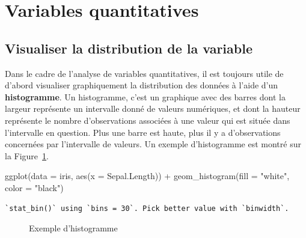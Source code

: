 \documentclass[
  letterpaper,
]{book}
\newenvironment{Shaded}{\begin{snugshade}}{\end{snugshade}}
\newcommand{\AttributeTok}[1]{\textcolor[rgb]{0.40,0.45,0.13}{#1}}
\newcommand{\FunctionTok}[1]{\textcolor[rgb]{0.28,0.35,0.67}{#1}}
\newcommand{\NormalTok}[1]{\textcolor[rgb]{0.00,0.23,0.31}{#1}}
\newcommand{\SpecialCharTok}[1]{\textcolor[rgb]{0.37,0.37,0.37}{#1}}
\newcommand{\StringTok}[1]{\textcolor[rgb]{0.13,0.47,0.30}{#1}}
\begin{document}
\section{Variables quantitatives}\label{variables-quantitatives}

\subsection{Visualiser la distribution de la
variable}\label{visualiser-la-distribution-de-la-variable}

Dans le cadre de l'analyse de variables quantitatives, il est toujours
utile de d'abord visualiser graphiquement la distribution des données à
l'aide d'un \textbf{histogramme}. Un histogramme, c'est un graphique
avec des barres dont la largeur représente un intervalle donné de
valeurs numériques, et dont la hauteur représente le nombre
d'observations associées à une valeur qui est située dans l'intervalle
en question. Plus une barre est haute, plus il y a d'observations
concernées par l'intervalle de valeurs. Un exemple d'histogramme est
montré sur la Figure~\ref{fig-geomhistogram}.

\begin{Shaded}
\begin{Highlighting}[]
\FunctionTok{ggplot}\NormalTok{(}\AttributeTok{data =}\NormalTok{ iris, }\FunctionTok{aes}\NormalTok{(}\AttributeTok{x =}\NormalTok{ Sepal.Length)) }\SpecialCharTok{+} 
  \FunctionTok{geom\_histogram}\NormalTok{(}\AttributeTok{fill =} \StringTok{"white"}\NormalTok{, }\AttributeTok{color =} \StringTok{"black"}\NormalTok{)}
\end{Highlighting}
\end{Shaded}

\begin{verbatim}
`stat_bin()` using `bins = 30`. Pick better value with `binwidth`.
\end{verbatim}

\begin{figure}[H]


\caption{\label{fig-geomhistogram}Exemple d'histogramme}

\end{figure}%
\end{document}
